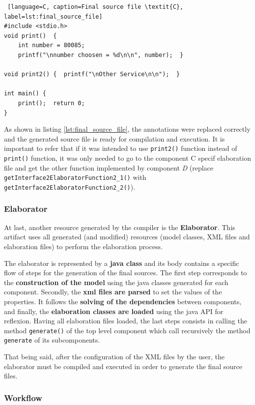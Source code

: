\documentclass[12pt]{article}
\begin{document}
{\begin{lstlisting} [language=C, caption=Final source file \textit{C}, label=lst:final_source_file]
#include <stdio.h>
void print()  {
	int number = 80085;
	printf("\nnumber choosen = %d\n\n", number);  }

void print2() {  printf("\nOther Service\n\n");  }

int main() {
	print();  return 0;  
}
\end{lstlisting}

As shown in listing \ref{lst:final_source_file}, the annotations were replaced correctly and the generated source file is ready for compilation and execution. It is important to refer that if it was intended to use \texttt{print2()} function instead of \texttt{print()} function, it was only needed to go to the component C specif elaboration file and get the other function implemented by component \textit{D} (replace \texttt{getInterface2ElaboratorFunction2\_1()} with \texttt{getInterface2ElaboratorFunction2\_2()}). 


\subsubsection*{Elaborator}

At last, another resource generated by the compiler is the \textbf{Elaborator}. This artifact uses all generated (and modified) resources (model classes, XML files and elaboration files) to perform the elaboration process.

The elaborator is represented by a \textbf{java class} and its body contains a specific flow of steps for the generation of the final sources. The first step corresponds to the \textbf{construction of the model} using the java classes generated for each component. Secondly, the \textbf{xml files are parsed} to set the values of the properties. It follows the \textbf{solving of the dependencies} between components, and finally, the \textbf{elaboration classes are loaded} using the java API for reflexion. Having all elaboration files loaded, the last steps consists in calling the method \texttt{generate()} of the top level component which call recursively the method \texttt{generate} of its subcomponents.

That being said, after the configuration of the XML files by the user, the elaborator must be compiled and executed in order to generate the final source files.


\subsubsection{Workflow}

}
\end{document}
